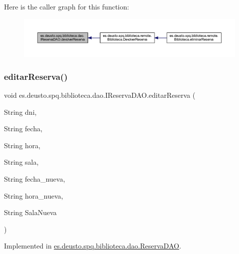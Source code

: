 Here is the caller graph for this function\+:
\nopagebreak
\begin{figure}[H]
\begin{center}
\leavevmode
\includegraphics[width=350pt]{interfacees_1_1deusto_1_1spq_1_1biblioteca_1_1dao_1_1_i_reserva_d_a_o_a5cd7d25bee6f31574e42d290a42cf856_icgraph}
\end{center}
\end{figure}
\mbox{\label{interfacees_1_1deusto_1_1spq_1_1biblioteca_1_1dao_1_1_i_reserva_d_a_o_a0e93c50de1d6d5d81972418b1f5f86bb}} 
\subsubsection{\texorpdfstring{editar\+Reserva()}{editarReserva()}}
{\footnotesize\ttfamily void es.\+deusto.\+spq.\+biblioteca.\+dao.\+I\+Reserva\+D\+A\+O.\+editar\+Reserva (\begin{DoxyParamCaption}\item[{String}]{dni,  }\item[{String}]{fecha,  }\item[{String}]{hora,  }\item[{String}]{sala,  }\item[{String}]{fecha\+\_\+nueva,  }\item[{String}]{hora\+\_\+nueva,  }\item[{String}]{Sala\+Nueva }\end{DoxyParamCaption})}



Implemented in \mbox{\hyperlink{classes_1_1deusto_1_1spq_1_1biblioteca_1_1dao_1_1_reserva_d_a_o_a88e9785413691dee23241ef307b4e93d}{es.\+deusto.\+spq.\+biblioteca.\+dao.\+Reserva\+D\+AO}}.

